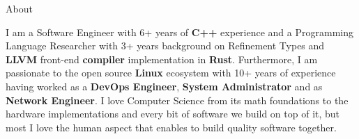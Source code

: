\documentclass[calibri]{mcdowellcv}
\begin{document}
	\makeheader{}

	\begin{cvsection}{About}
		\begin{cvsubsection}{}{}{}
			I am a Software Engineer with 6+ years of \textbf{C++} experience and a Programming Language Researcher with 3+ years background on Refinement Types and \textbf{LLVM} front-end \textbf{compiler} implementation in \textbf{Rust}.
			Furthermore, I am passionate to the open source \textbf{Linux} ecosystem with 10+ years of experience having worked as a \textbf{DevOps Engineer}, \textbf{System Administrator} and as \textbf{Network Engineer}.
			I love Computer Science from its math foundations to the hardware implementations and every bit of software we build on top of it, but most I love the human aspect that enables to build quality software together.
		\end{cvsubsection}
	\end{cvsection}
\end{document}
